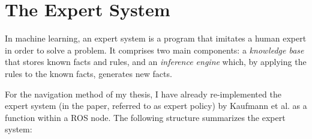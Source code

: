 %



\section{The Expert System}\label{sec:expert_system}

In machine learning, an expert system is a program that imitates a human expert in order to solve a problem. 
It comprises two main components: a \textit{knowledge base} that stores known facts and rules, and an
\textit{inference engine} which, by applying the rules to the known facts,
generates new facts. \cite{jackson1986introduction}

For the navigation method of my thesis, 
I have already re-implemented the expert system (in the paper, referred to as expert policy) 
by Kaufmann et al. \cite{Kaufmann2018} as a function within a ROS node. 
The following structure summarizes the expert system:

